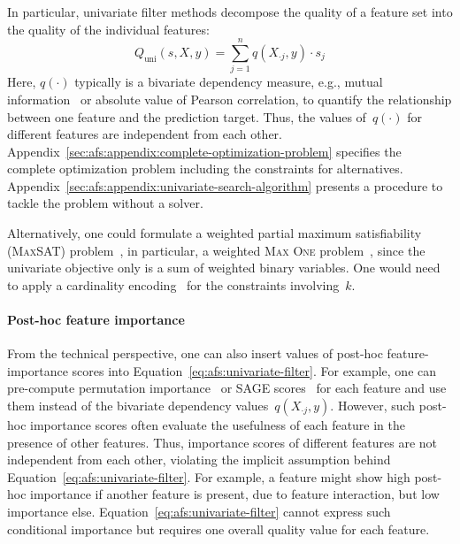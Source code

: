 \documentclass{article}
\theoremstyle{definition}
\begin{document}
In particular, univariate filter methods decompose the quality of a feature set into the quality of the individual features:
%
\begin{equation}
	Q_{\text{uni}}(s,X,y) = \sum_{j=1}^{n} q(X_{\cdot{}j},y) \cdot s_j
	\label{eq:afs:univariate-filter}
\end{equation}
%
Here, $q(\cdot)$ typically is a bivariate dependency measure, e.g., mutual information~\cite{kraskov2004estimating} or absolute value of Pearson correlation, to quantify the relationship between one feature and the prediction target.
Thus, the values of~$q(\cdot)$ for different features are independent from each other.
Appendix~\ref{sec:afs:appendix:complete-optimization-problem} specifies the complete optimization problem including the constraints for alternatives.
Appendix~\ref{sec:afs:appendix:univariate-search-algorithm} presents a procedure to tackle the problem without a solver.

Alternatively, one could formulate a weighted partial maximum satisfiability (\textsc{MaxSAT}) problem~\cite{bacchus2021maximum, li2021maxsat}, in particular, a weighted \textsc{Max One} problem~\cite{khanna1997complete}, since the univariate objective only is a sum of weighted binary variables.
One would need to apply a cardinality encoding~\cite{sinz2005towards} for the constraints involving~$k$.

\paragraph{Post-hoc feature importance}

From the technical perspective, one can also insert values of post-hoc feature-importance scores into Equation~\ref{eq:afs:univariate-filter}.
For example, one can pre-compute permutation importance~\cite{breiman2001random} or SAGE scores~\cite{covert2020understanding} for each feature and use them instead of the bivariate dependency values~$q(X_{\cdot{}j},y)$.
However, such post-hoc importance scores often evaluate the usefulness of each feature in the presence of other features.
Thus, importance scores of different features are not independent from each other, violating the implicit assumption behind Equation~\ref{eq:afs:univariate-filter}.
For example, a feature might show high post-hoc importance if another feature is present, due to feature interaction, but low importance else.
Equation~\ref{eq:afs:univariate-filter} cannot express such conditional importance but requires one overall quality value for each feature.
\end{document}
